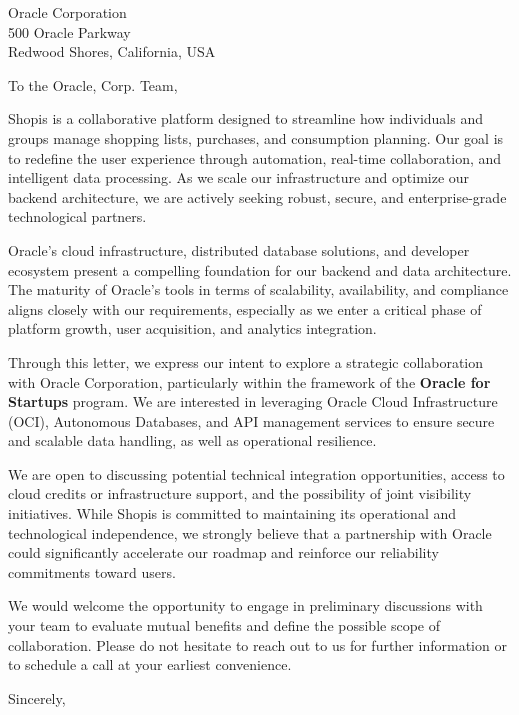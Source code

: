 \documentclass[10pt,language=french]{ETSletter}  %
\begin{document}
\begin{letter}{
    Oracle Corporation\\ 
    500 Oracle Parkway\\ 
    Redwood Shores, California, USA\\ 
}

\opening{To the Oracle, Corp. Team,}

Shopis is a collaborative platform designed to streamline how individuals and groups manage shopping lists, purchases, and consumption planning. Our goal is to redefine the user experience through automation, real-time collaboration, and intelligent data processing. As we scale our infrastructure and optimize our backend architecture, we are actively seeking robust, secure, and enterprise-grade technological partners.

Oracle’s cloud infrastructure, distributed database solutions, and developer ecosystem present a compelling foundation for our backend and data architecture. The maturity of Oracle’s tools in terms of scalability, availability, and compliance aligns closely with our requirements, especially as we enter a critical phase of platform growth, user acquisition, and analytics integration.

Through this letter, we express our intent to explore a strategic collaboration with Oracle Corporation, particularly within the framework of the \textbf{Oracle for Startups} program. We are interested in leveraging Oracle Cloud Infrastructure (OCI), Autonomous Databases, and API management services to ensure secure and scalable data handling, as well as operational resilience.

We are open to discussing potential technical integration opportunities, access to cloud credits or infrastructure support, and the possibility of joint visibility initiatives. While Shopis is committed to maintaining its operational and technological independence, we strongly believe that a partnership with Oracle could significantly accelerate our roadmap and reinforce our reliability commitments toward users.

We would welcome the opportunity to engage in preliminary discussions with your team to evaluate mutual benefits and define the possible scope of collaboration. Please do not hesitate to reach out to us for further information or to schedule a call at your earliest convenience.

\closing{Sincerely,}

\end{letter}
\end{document}
